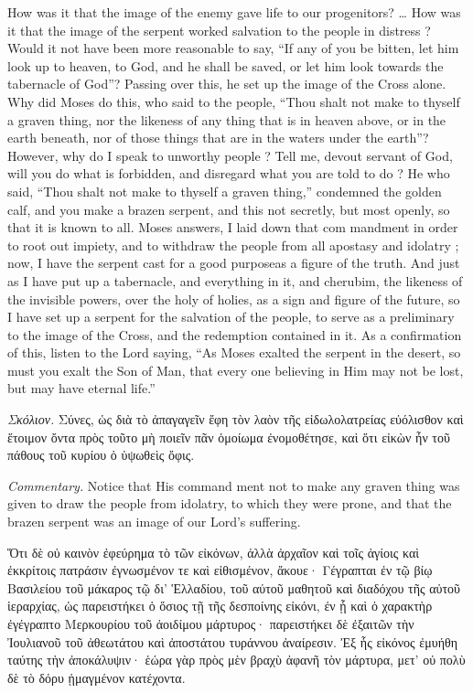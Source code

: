 \documentclass[10pt]{book}
\newcommand{\switchgreek}[1][]{\selectlanguage{polutonikogreek} \switchcolumn*[#1]}
\newcommand{\switchenglish}{\selectlanguage{english} \switchcolumn}
\begin{document}
\begin{paracol}{2}
How was it that the image of the enemy 
gave life to our progenitors? \ldots
How was it that the image of the serpent 
worked salvation to the people in distress ? 
Would it not have been more reasonable to 
say, ``If any of you be bitten, let him look up to 
heaven, to God, and he shall be saved, or let 
him look towards the tabernacle of God''? 
Passing over this, he set up the image of the 
Cross alone. Why did Moses do this, who 
said to the people, ``Thou shalt not make to 
thyself a graven thing, nor the likeness of any 
thing that is in heaven above, or in the earth 
beneath, nor of those things that are in the 
waters under the earth''? However, why do 
I speak to unworthy people ? Tell me, devout 
servant of God, will you do what is forbidden, 
and disregard what you are told to do ? He 
who said, ``Thou shalt not make to thyself a 
graven thing,'' condemned the golden calf, and 
you make a brazen serpent, and this not 
secretly, but most openly, so that it is known to 
all. Moses answers, I laid down that com 
mandment in order to root out impiety, and to 
withdraw the people from all apostasy and 
idolatry ; now, I have the serpent cast for a 
good purpose\textemdash as a figure of the truth. And 
just as I have put up a tabernacle, and everything
in it, and cherubim, the likeness of the 
invisible powers, over the holy of holies, as a 
sign and figure of the future, so I have set 
up a serpent for the salvation of the people, to 
serve as a preliminary to the image of the 
Cross, and the redemption contained in it. As 
a confirmation of this, listen to the Lord saying, 
``As Moses exalted the serpent in the desert, so 
must you exalt the Son of Man, that every one 
believing in Him may not be lost, but may 
have eternal life.''

\switchgreek

\emph{Σκόλιον.} Σύνες, ὡς διὰ τὸ ἀπαγαγεῖν ἔφη τὸν λαὸν τῆς εἰδωλολατρείας
εὐόλισθον καὶ ἕτοιμον ὄντα πρὸς τοῦτο μὴ ποιεῖν πᾶν ὁμοίωμα ἐνομοθέτησε, καὶ
ὅτι εἰκὼν ἦν τοῦ πάθους τοῦ κυρίου ὁ ὑψωθεὶς ὄφις.

\switchenglish

\emph{Commentary.} 
Notice that His command 
ment not to make any graven thing was given 
to draw the people from idolatry, to which they 
were prone, and that the brazen serpent was an 
image of our Lord's suffering. 

\switchgreek

Ὅτι δὲ οὐ καινὸν ἐφεύρημα τὸ τῶν εἰκόνων, ἀλλὰ ἀρχαῖον καὶ τοῖς ἁγίοις καὶ
ἐκκρίτοις πατράσιν ἐγνωσμένον τε καὶ εἰθισμένον, ἄκουε·
Γέγραπται ἐν τῷ βίῳ Βασιλείου τοῦ μάκαρος τῷ δι’ Ἑλλαδίου, τοῦ αὐτοῦ μαθητοῦ
καὶ διαδόχου τῆς αὐτοῦ ἱεραρχίας, ὡς παρειστήκει ὁ ὅσιος τῇ τῆς δεσποίνης
εἰκόνι, ἐν ᾗ καὶ ὁ χαρακτὴρ ἐγέγραπτο Μερκουρίου τοῦ ἀοιδίμου μάρτυρος·
παρειστήκει δὲ ἐξαιτῶν τὴν Ἰουλιανοῦ τοῦ ἀθεωτάτου καὶ ἀποστάτου τυράννου
ἀναίρεσιν. Ἐξ ἧς εἰκόνος ἐμυήθη ταύτης τὴν ἀποκάλυψιν· ἑώρα γὰρ πρὸς μὲν βραχὺ
ἀφανῆ τὸν μάρτυρα, μετ’ οὐ πολὺ δὲ τὸ δόρυ ᾑμαγμένον κατέχοντα.


\end{paracol}
\end{document}
